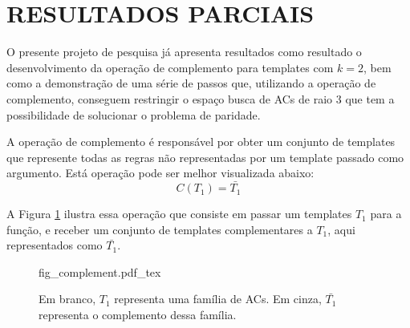 \section{RESULTADOS PARCIAIS}
\label{sec:resultadosParciais}

O presente projeto de pesquisa já apresenta resultados como resultado o desenvolvimento da operação de complemento para templates com $k=2$, bem como a demonstração de uma série de passos que, utilizando a operação de complemento, conseguem restringir o espaço busca de ACs de raio 3 que tem a possibilidade de solucionar o problema de paridade.

A operação de complemento é responsável por obter um conjunto de templates que represente todas as regras não representadas por um template passado como argumento. Está operação pode ser melhor visualizada abaixo:
\begin{equation}
C(T_1)=\bar{T_1}
\end{equation}

A Figura \ref{fig:complement} ilustra essa operação que consiste em passar um templates $T_1$ para a função, e receber um conjunto de templates complementares a $T_1$, aqui representados como $\bar{T_1}$.
\begin{figure}[h!]
  \centering
  \def\svgscale{0.5}
  {fig_complement.pdf_tex}
  \caption{Em branco, $T_1$ representa uma família de ACs. Em cinza, $\bar{T_1}$ representa o complemento dessa família.}
  \label{fig:complement}
\end{figure}

